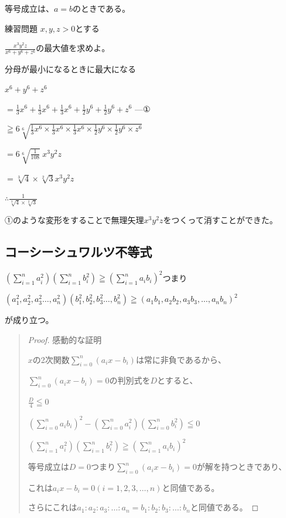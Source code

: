 \documentclass[uplatex,fleqn]{jsbook}
\begin{document}
等号成立は、$a=b$のときである。

\begin{problem}{練習問題}
    $x,y,z>0$とする

    $\displaystyle \frac{x^3y^2z}{x^6+y^6+z^6}$の最大値を求めよ。
\end{problem}

\begin{answer}
        分母が最小になるときに最大になる

        $x^6+y^6+z^6$

        $\displaystyle=\frac{1}{3}x^6+\frac{1}{3}x^6+\frac{1}{3}x^6+\frac{1}{2}y^6+\frac{1}{2}y^6+z^6\text{ ---①}$

        $\displaystyle\geqq6\sqrt[6]{\frac{1}{3}x^6\times\frac{1}{3}x^6\times\frac{1}{3}x^6\times\frac{1}{2}y^6\times\frac{1}{2}y^6\times z^6}$

        $\displaystyle=6\sqrt[6]{\frac{1}{108}}\ x^3y^2z$

        $\displaystyle=\sqrt[3]{4}\times\sqrt[2]{3}x^3y^2z$

        $\displaystyle\therefore \frac{1}{\sqrt[3]{4}\times\sqrt[2]{3}}$

        ①のような変形をすることで無理矢理$x^3y^2z$をつくって消すことができた。
\end{answer}

\subsection{コーシーシュワルツ不等式}
$\displaystyle \left(\sum_{i=1}^n a^2_i\right)\left(\sum_{i=1}^n b^2_i\right)\geqq\left(\sum_{i=1}^n a_ib_i\right)^2$つまり

$\left(a^2_1,a^2_2,a^2_3\dots,a^2_n\right)\left(b^2_1,b^2_2,b^2_3\dots,b^2_n\right)\geqq\left(a_1b_1,a_2b_2,a_3b_3,\dots,a_nb_n\right)^2$

が成り立つ。
\begin{quote}
    \begin{proof}
        感動的な証明

        $x$の2次関数$\displaystyle \sum_{i=0}^{n}(a_ix-b_i)$は常に非負であるから、

        $\displaystyle \sum_{i=0}^{n}(a_ix-b_i)=0$の判別式を$D$とすると、

        $\displaystyle\frac{D}{4}\leqq 0$

        $\displaystyle \left(\sum_{i=0}^{n}a_ib_i\right)^2-\left(\sum_{i=0}^{n}a_i^2\right)\left(\sum_{i=0}^{n}b_i^2\right)\leqq 0$

        $\displaystyle \left(\sum_{i=1}^n a^2_i\right)\left(\sum_{i=1}^n b^2_i\right)\geqq\left(\sum_{i=1}^n a_ib_i\right)^2$

        等号成立は$D=0$つまり$\displaystyle \sum_{i=0}^{n}(a_ix-b_i)=0$が解を持つときであり、

        これは$a_ix-b_i=0 \left(i = 1,2,3,\dots ,n\right)$と同値である。

        さらにこれは$a_1:a_2:a_3:\dots:a_n=b_1:b_2:b_3:\dots:b_n$と同値である。
    \end{proof}
\end{quote}
\end{document}
